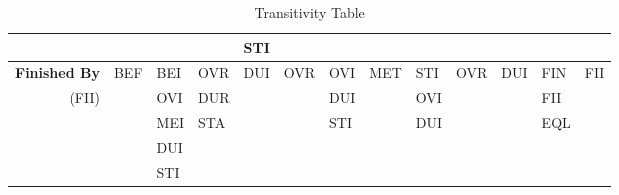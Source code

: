 \documentclass[11pt]{report}
\newenvironment{vvarmargin}[2]
{
  \begin{list}{}
  {
    \setlength{\topsep}{0pt}
    \setlength{\leftmargin}{0pt}
    \setlength{\rightmargin}{0pt}
    \setlength{\listparindent}{\parindent}
    \setlength{\itemindent}{\parindent}
    \setlength{\parsep}{0pt plus 1pt}
    \addtolength{\leftmargin}{#1}\addtolength{\rightmargin}{#2}
  }
  \item
}
{
  \end{list}
}
\begin{document}
\begin{table}[p]
\begin{vvarmargin}{-4cm}{-4cm}
\begin{center}
\begin{tabular}[t]{|r|l|l|l|l|l|l|l|l|l|l|l|l|}
                                        &                         &                         &                         & STI                     &                         &                         &                         &                         &                         &                         &                         &                         \\
                \hline
                \textbf{Finished By}    & BEF                     & BEI                     & OVR                     & DUI                     & OVR                     & OVI                     & MET                     & STI                     & OVR                     & DUI                     & FIN                     & FII                     \\
                (FII)                   &                         & OVI                     & DUR                     &                         &                         & DUI                     &                         & OVI                     &                         &                         & FII                     &                         \\
                                        &                         & MEI                     & STA                     &                         &                         & STI                     &                         & DUI                     &                         &                         & EQL                     &                         \\
                                        &                         & DUI                     &                         &                         &                         &                         &                         &                         &                         &                         &                         &                         \\
                                        &                         & STI                     &                         &                         &                         &                         &                         &                         &                         &                         &                         &                         \\
                \hline
              \end{tabular}
            \end{center}
            \caption[]{Transitivity Table}
            \label{table-trans}
          \end{vvarmargin}
        \end{table}
\end{document}
